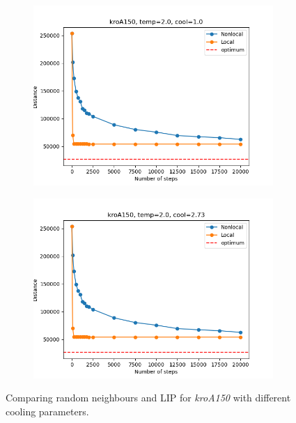 \begin{figure}[!htb]
	\centering
	\begin{subfigure}{0.45\textwidth}
		\includegraphics[width=\textwidth]{img/kroA150_temp=2.0_cool=1.0}
	\end{subfigure}
	\begin{subfigure}{0.45\textwidth}
		\includegraphics[width=\textwidth]{img/kroA150_temp=2.0_cool=2.73}
	\end{subfigure}
	\caption{Comparing random neighbours and LIP for \textit{kroA150} with different cooling parameters.}
	\label{fig:kroA150_comp}
\end{figure}

